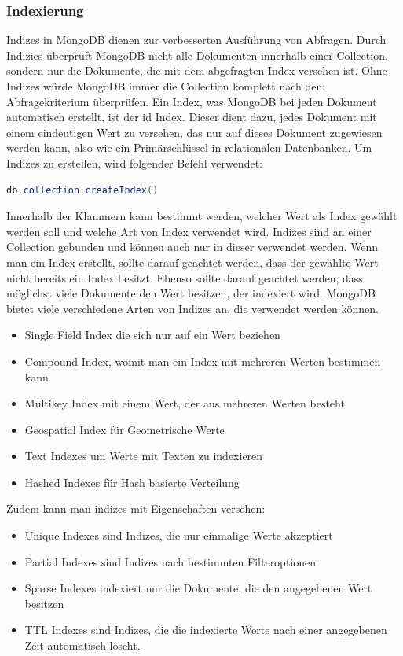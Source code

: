 \subsubsection{Indexierung}
Indizes in MongoDB dienen zur verbesserten Ausf\"uhrung von Abfragen. Durch Indizies  \"uberpr\"uft MongoDB nicht alle Dokumenten innerhalb einer Collection, sondern nur die Dokumente, die mit dem abgefragten Index versehen ist. Ohne Indizes w\"urde MongoDB immer die Collection komplett nach dem Abfragekriterium \"uberpr\"ufen. Ein Index, was MongoDB bei jeden Dokument automatisch erstellt, ist der id Index. Dieser dient dazu, jedes Dokument mit einem eindeutigen Wert zu versehen, das nur auf dieses Dokument zugewiesen werden kann, also wie ein Prim\"arschl\"ussel in relationalen Datenbanken. Um Indizes zu erstellen, wird folgender Befehl verwendet:
\begin{lstlisting}[caption={Befehl, um eine Collection zu erstellen}, language=java,captionpos=t,numbers=none, numberstyle=\tiny,basicstyle=\scriptsize,breaklines=true]
db.collection.createIndex()
\end{lstlisting}
Innerhalb der Klammern kann bestimmt werden, welcher Wert als Index gew\"ahlt werden soll und welche Art von Index verwendet wird. Indizes sind an einer Collection gebunden und k\"onnen auch nur in dieser verwendet werden. Wenn man ein Index erstellt, sollte darauf geachtet werden, dass der gew\"ahlte Wert nicht bereits ein Index besitzt.  Ebenso sollte darauf geachtet werden, dass m\"oglichst viele Dokumente den Wert besitzen, der indexiert wird.\cite{mongo01}
MongoDB bietet viele verschiedene Arten von Indizes an, die verwendet werden k\"onnen.
\begin{itemize}
\item Single Field Index die sich nur auf ein Wert beziehen 
\item Compound Index, womit man ein Index mit mehreren Werten bestimmen kann
\item Multikey Index mit einem Wert, der aus mehreren Werten besteht
\item Geospatial Index f\"ur Geometrische Werte
\item Text Indexes um Werte mit Texten zu indexieren
\item Hashed Indexes f\"ur Hash basierte Verteilung
\end{itemize}
Zudem kann man indizes mit Eigenschaften versehen:
\begin{itemize}
\item Unique Indexes sind Indizes, die nur einmalige Werte akzeptiert
\item Partial Indexes sind Indizes nach bestimmten Filteroptionen
\item Sparse Indexes indexiert nur die Dokumente, die den angegebenen Wert besitzen
\item TTL Indexes sind Indizes, die die indexierte Werte nach einer angegebenen Zeit automatisch l\"oscht.
\end{itemize}
